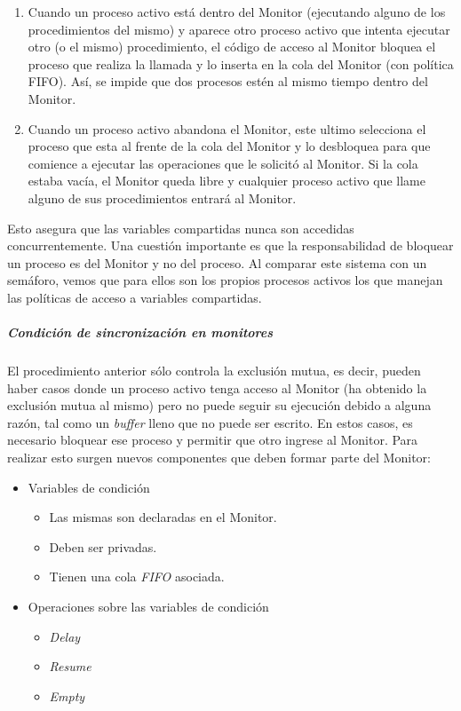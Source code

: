 \begin{enumerate}
    \item Cuando un proceso activo está dentro del Monitor (ejecutando alguno de los procedimientos del mismo) y aparece otro proceso activo que intenta ejecutar otro (o el mismo) procedimiento, el código de acceso al Monitor bloquea el proceso que realiza la llamada y lo inserta en la cola del Monitor (con política FIFO). Así, se impide que dos procesos estén al mismo tiempo dentro del Monitor.

    \item Cuando un proceso activo abandona el Monitor, este ultimo selecciona el proceso que esta al frente de la cola del Monitor y lo desbloquea para que comience a ejecutar las operaciones que le solicitó al Monitor. Si la cola estaba vacía, el Monitor queda libre y cualquier proceso activo que llame alguno de sus procedimientos entrará al Monitor.
\end{enumerate}

Esto asegura que las variables compartidas nunca son accedidas concurrentemente. Una cuestión importante es que la responsabilidad de bloquear un proceso es del Monitor y no del proceso.
Al comparar este sistema con un semáforo, vemos que para ellos son los propios procesos activos los que manejan las políticas de acceso a variables compartidas.

\subparagraph{Condición de sincronización en monitores}
\hfill
\par El procedimiento anterior sólo controla la exclusión mutua, es decir, pueden haber casos donde un proceso activo tenga acceso al Monitor (ha obtenido la exclusión mutua al mismo) pero no puede seguir su ejecución debido a alguna razón, tal como un \textit{buffer} lleno que no puede ser escrito. En estos casos, es necesario bloquear ese proceso y permitir que otro ingrese al Monitor. Para realizar esto surgen nuevos componentes que deben formar parte del Monitor:

\begin{itemize}
    \item Variables de condición
    \begin{itemize}
        \item Las mismas son declaradas en el Monitor.
        \item Deben ser privadas. 
        \item Tienen una cola \textit{FIFO} asociada.
    \end{itemize}
    \item Operaciones sobre las variables de condición
    \begin{itemize}
        \item \textit{Delay}
        \item \textit{Resume}
        \item \textit{Empty}
    \end{itemize}
\end{itemize}

